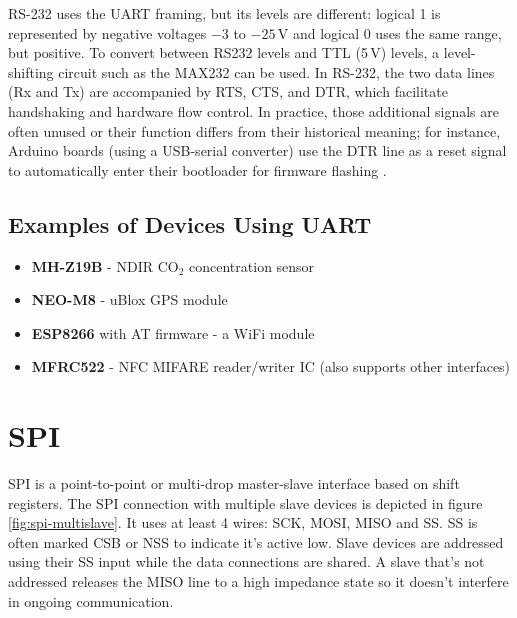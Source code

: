 RS-232 uses the \gls{UART} framing, but its levels are different: logical 1 is represented by negative voltages $-3$ to $-25$\,V and logical 0 uses the same range, but positive. To convert between RS232 levels and \gls{TTL} (5\,V) levels, a level-shifting circuit such as the MAX232 can be used. In RS-232, the two data lines (Rx and Tx) are accompanied by \gls{RTS}, \gls{CTS}, and \gls{DTR}, which facilitate handshaking and hardware flow control. In practice, those additional signals are often unused or their function differs from their historical meaning; for instance, Arduino boards (using a USB-serial converter) use the \gls{DTR} line as a reset signal to automatically enter their bootloader for firmware flashing \cite{arduinodtr}.

\subsection{Examples of Devices Using UART}

\begin{itemize}
	\item \textbf{MH-Z19B} - \gls{NDIR} CO$_2$ concentration sensor
	\item \textbf{NEO-M8} - uBlox \gls{GPS} module
	\item \textbf{ESP8266} with AT firmware - a WiFi module
	\item \textbf{MFRC522} - \gls{NFC} MIFARE reader/writer \gls{IC} (also supports other interfaces)
\end{itemize}

\section{SPI} \label{sec:theory-spi}

\acrfull{SPI} is a point-to-point or multi-drop master-slave interface based on shift registers. The \gls{SPI} connection with multiple slave devices is depicted in figure \ref{fig:spi-multislave}. It uses at least 4 wires: \gls{SCK}, \gls{MOSI}, \gls{MISO} and \gls{SS}. \gls{SS} is often marked \gls{CSB} or \gls{NSS} to indicate it's active low. Slave devices are addressed using their \gls{SS} input while the data connections are shared. A slave that's not addressed releases the \gls{MISO} line to a high impedance state so it doesn't interfere in ongoing communication.


